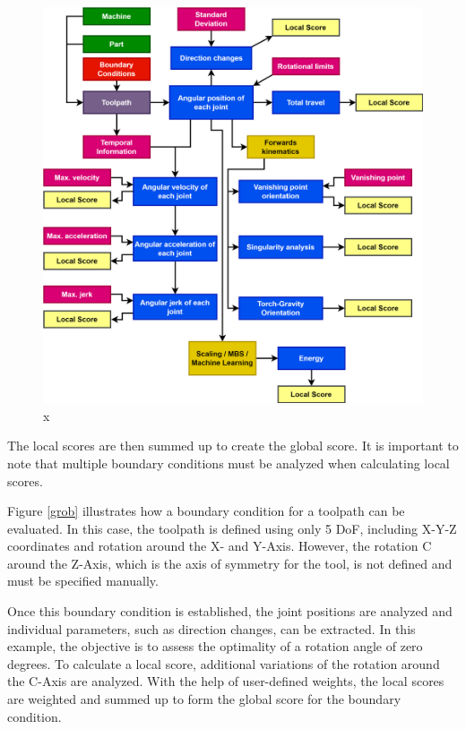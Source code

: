 \begin{figure}[H]
	\centerline{\includegraphics[width=1\textwidth]{figures/flowchart.png}}
	\caption{x}
	\label{allflow}
\end{figure}


The local scores are then summed up to create the global score. It is important to note that multiple boundary conditions must be analyzed when calculating local scores.

Figure \ref{grob} illustrates how a boundary condition for a toolpath can be evaluated. In this case, the toolpath is defined using only 5 DoF, including X-Y-Z coordinates and rotation around the X- and Y-Axis. However, the rotation C around the Z-Axis, which is the axis of symmetry for the tool, is not defined and must be specified manually.


Once this boundary condition is established, the joint positions are analyzed and individual parameters, such as direction changes, can be extracted. In this example, the objective is to assess the optimality of a rotation angle of zero degrees.
To calculate a local score, additional variations of the rotation around the C-Axis are analyzed. With the help of user-defined weights, the local scores are weighted and summed up to form the global score for the boundary condition.


